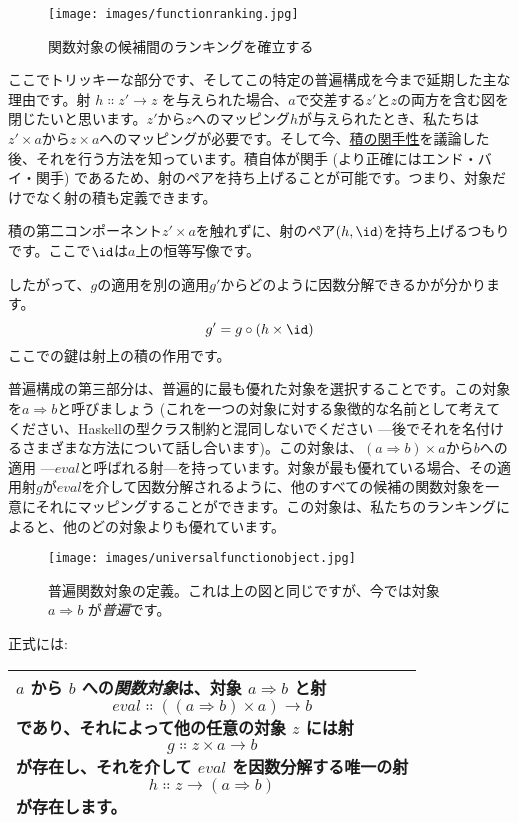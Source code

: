 \begin{figure}[H]
  \centering
  \texttt{[image: images/functionranking.jpg]}
  \caption{関数対象の候補間のランキングを確立する}
\end{figure}

\noindent
ここでトリッキーな部分です、そしてこの特定の普遍構成を今まで延期した主な理由です。射 $h \Colon z'\to z$ を与えられた場合、$a$で交差する$z'$と$z$の両方を含む図を閉じたいと思います。$z'$から$z$へのマッピング$h$が与えられたとき、私たちは$z' \times a$から$z \times a$へのマッピングが必要です。そして今、\hyperref[functoriality]{積の関手性}を議論した後、それを行う方法を知っています。積自体が関手 (より正確にはエンド・バイ・関手) であるため、射のペアを持ち上げることが可能です。つまり、対象だけでなく射の積も定義できます。

積の第二コンポーネント$z' \times a$を触れずに、射のペア$(h, \id)$を持ち上げるつもりです。ここで$\id$は$a$上の恒等写像です。

したがって、$g$の適用を別の適用$g'$からどのように因数分解できるかが分かります。
\[g' = g \circ (h \times \id)\]
ここでの鍵は射上の積の作用です。

普遍構成の第三部分は、普遍的に最も優れた対象を選択することです。この対象を$a \Rightarrow b$と呼びましょう (これを一つの対象に対する象徴的な名前として考えてください、Haskellの型クラス制約と混同しないでください ---後でそれを名付けるさまざまな方法について話し合います)。この対象は、$(a \Rightarrow b) \times a$から$b$への適用 ---$\mathit{eval}$と呼ばれる射---を持っています。対象が最も優れている場合、その適用射$g$が$\mathit{eval}$を介して因数分解されるように、他のすべての候補の関数対象を一意にそれにマッピングすることができます。この対象は、私たちのランキングによると、他のどの対象よりも優れています。

\begin{figure}[H]
  \centering
  \texttt{[image: images/universalfunctionobject.jpg]}
  \caption{普遍関数対象の定義。これは上の図と同じですが、今では対象 $a \Rightarrow b$ が\emph{普遍}です。}
\end{figure}

\noindent
正式には:

\begin{longtable}[]{@{}l@{}}
  \toprule
  \begin{minipage}[t]{0.97\columnwidth}\raggedright\strut
    $a$ から $b$ への\emph{関数対象}は、対象
    $a \Rightarrow b$ と射
    \[\mathit{eval} \Colon ((a \Rightarrow b) \times a) \to b\]
    であり、それによって他の任意の対象 $z$ には射
    \[g \Colon z \times a \to b\]
    が存在し、それを介して $\mathit{eval}$ を因数分解する唯一の射
    \[h \Colon z \to (a \Rightarrow b)\]
    が存在します。
  \end{minipage}\tabularnewline
  \bottomrule
\end{longtable}

